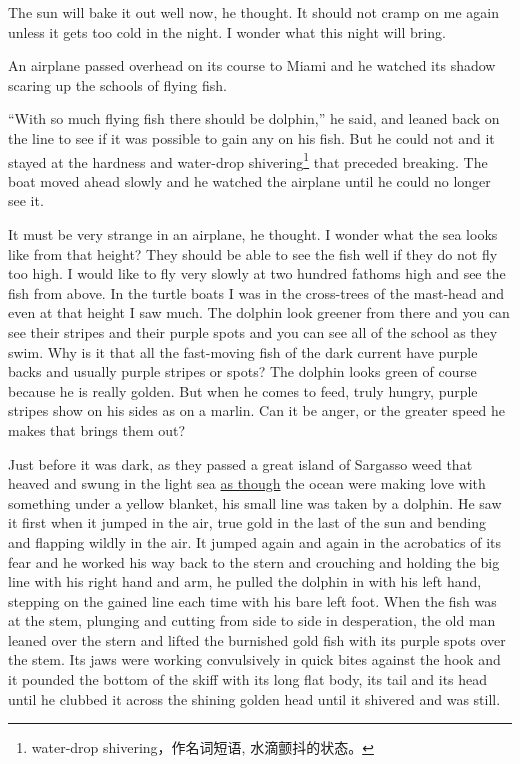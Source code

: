 \documentclass[fontset=ubuntu,zihao=-4]{ctexrep}
\newlength{\drop}%
\begin{document}
The sun will \gls{bake} it out well now, he thought. It
should not cramp on me again unless it gets too cold in the night. I wonder
what this night will bring.

An airplane passed overhead on its course to Miami and he watched its shadow
scaring up the schools of flying fish.

``With so much flying fish there should be dolphin,'' he said, and leaned
back on the line to see if it was possible to gain any on his fish. But he
could not and it stayed at the \gls{hardness} and water-drop
shivering\footnote{water-drop shivering，作名词短语, 水滴颤抖的状态。} that
\gls{preceded} breaking. The boat moved ahead slowly and he watched the
airplane until he could no longer see it.

It must be very strange in an airplane, he thought. I wonder what the sea
looks like from that height? They should be able to see the fish well if
they do not fly too high. I would like to fly very slowly at two hundred
fathoms high and see the fish from above. In the turtle boats I was in the
cross-trees of the mast-head and even at that height I saw much. The dolphin
look greener from there and you can see their stripes and their purple \glspl{spot}
and you can see all of the school as they swim. Why is it that all the
fast-moving fish of the dark current have purple backs and usually purple
stripes or spots? The dolphin looks green of course because he is really
golden. But when he comes to feed, truly hungry, purple stripes show on his
sides as on a marlin. Can it be \gls{anger}, or the greater speed he makes
that brings them out?

Just before it was dark, as they passed a great island of Sargasso weed that
\gls{heaved} and swung in the light sea \uline{as though} the ocean were making love
with something under a yellow blanket, his small line was taken by a
dolphin. He saw it first when it jumped in the air, true gold in the last of
the sun and \gls{bending} and \gls{flapping} wildly in the air. It jumped
again and again in the \gls{acrobatics} of its \gls{fear} and he worked his
way back to the stern and \gls{crouching} and holding the big line with his
right hand and arm, he pulled the dolphin in with his left hand, stepping on
the gained line each time with his bare left foot. When the fish was at the
\gls{stem}, \gls{plunging} and cutting from side to side in
\gls{desperation}, the old man leaned over the stern and lifted the
\gls{burnished} gold fish with its purple spots over the stem. Its
\glspl{jaw} were working \gls{convulsively} in quick \glspl{bite} against the hook
and it pounded the bottom of the skiff with its long flat body, its tail and
its head until he \gls{clubbed} it across the shining golden head until it
shivered and was still.
\end{document}
